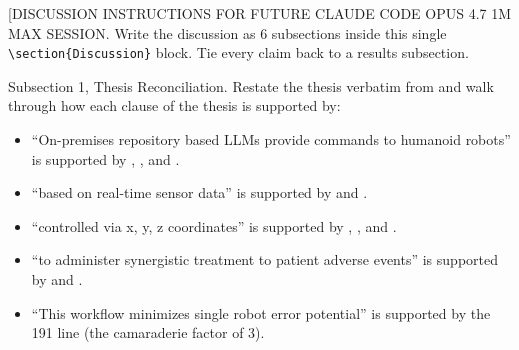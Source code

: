 %
%

\begin{sectionaccent}

[DISCUSSION INSTRUCTIONS FOR FUTURE CLAUDE CODE OPUS 4.7 1M MAX SESSION.
Write the discussion as 6 subsections inside this single
\texttt{\textbackslash section\{Discussion\}} block. Tie every claim back to a
results subsection.

Subsection 1, Thesis Reconciliation. Restate the thesis verbatim from
 and
walk through how each clause of the thesis is supported by:
\begin{itemize}
  \item ``On-premises repository based LLMs provide commands to
        humanoid robots'' is supported by
        ,
        , and
        .
  \item ``based on real-time sensor data'' is supported by
         and
        .
  \item ``controlled via x, y, z coordinates'' is supported by
        ,
        , and
        .
  \item ``to administer synergistic treatment to patient adverse
        events'' is supported by
         and
        .
  \item ``This workflow minimizes single robot error potential'' is
        supported by the 191 line
         (the camaraderie
        factor of 3).
\end{itemize}


\end{sectionaccent}
